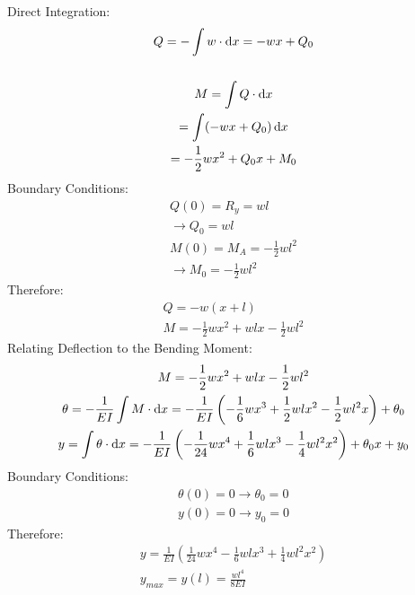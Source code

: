 \documentclass[class=report, crop=false, 12pt,a4paper]{standalone}
\begin{document}
Direct Integration:
\begin{gather}
  Q = -\int w \cdot \dif x = -wx + Q_0 \\\\
  M = \int Q \cdot \dif x \\
  = \int (-wx + Q_0)\dif x \\
  = -\frac{1}{2}wx^2 + Q_0x + M_0
\end{gather}
Boundary Conditions:
\begin{gather}
  Q(0) = R_y = wl \\
  \rightarrow Q_0 = wl \\
  M(0) = M_A = -\frac{1}{2}wl^2 \\
  \rightarrow M_0 = -\frac{1}{2}wl^2
\end{gather}
Therefore:
\begin{gather}
  Q = -w(x+l) \\
  M = -\frac{1}{2}wx^2 + wlx - \frac{1}{2}wl^2
\end{gather}
Relating Deflection to the Bending Moment:
\begin{gather}
  M = -\frac{1}{2}wx^2 + wlx -\frac{1}{2}wl^2 \\
  \theta = -\frac{1}{EI}\int M \cdot \dif x = -\frac{1}{EI} \left(-\frac{1}{6}wx^3 + \frac{1}{2}wlx^2 - \frac{1}{2}wl^2x \right) + \theta_0 \\
  y = \int \theta \cdot \dif x = -\frac{1}{EI} \left(-\frac{1}{24}wx^4 + \frac{1}{6}wlx^3 - \frac{1}{4}wl^2x^2 \right) + \theta_0x + y_0 \\
\end{gather}
Boundary Conditions:
\begin{gather}
  \theta(0) = 0 \rightarrow \theta_0 = 0 \\
  y(0) = 0 \rightarrow y_0 = 0
\end{gather}
Therefore:
\begin{gather}
  y = \frac{1}{EI} \left(\frac{1}{24}wx^4 - \frac{1}{6}wlx^3 + \frac{1}{4}wl^2x^2 \right) \\
  y_{max} = y(l) = \frac{wl^4}{8EI}
\end{gather}
\end{document}
